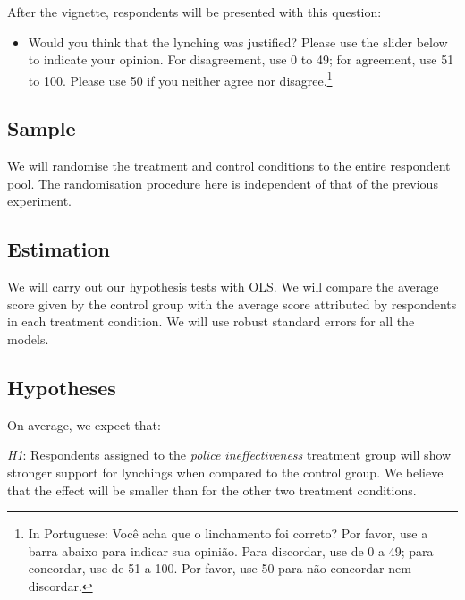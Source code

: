 \documentclass[12pt,a4paper,]{article}
\providecommand{\tightlist}{%
   \setlength{\itemsep}{0pt}\setlength{\parskip}{0pt}}
\begin{document}
After the vignette, respondents will be presented with this question:

\begin{itemize}
\tightlist
\item
  Would you think that the lynching was justified? Please use the slider
  below to indicate your opinion. For disagreement, use 0 to 49; for
  agreement, use 51 to 100. Please use 50 if you neither agree nor
  disagree.\footnote{In Portuguese: Você acha que o linchamento foi
    correto? Por favor, use a barra abaixo para indicar sua opinião.
    Para discordar, use de 0 a 49; para concordar, use de 51 a 100. Por
    favor, use 50 para não concordar nem discordar.}
\end{itemize}

\hypertarget{sample-1}{%
\subsection{Sample}\label{sample-1}}

We will randomise the treatment and control conditions to the entire
respondent pool. The randomisation procedure here is independent of that
of the previous experiment.

\hypertarget{estimation-1}{%
\subsection{Estimation}\label{estimation-1}}

We will carry out our hypothesis tests with OLS. We will compare the
average score given by the control group with the average score
attributed by respondents in each treatment condition. We will use
robust standard errors for all the models.

\hypertarget{hypotheses-1}{%
\subsection{Hypotheses}\label{hypotheses-1}}

On average, we expect that:

\vspace{.5cm}

\noindent \emph{H1}: Respondents assigned to the \emph{police
ineffectiveness} treatment group will show stronger support for
lynchings when compared to the control group. We believe that the effect
will be smaller than for the other two treatment conditions.

\vspace{.3cm}
\end{document}
